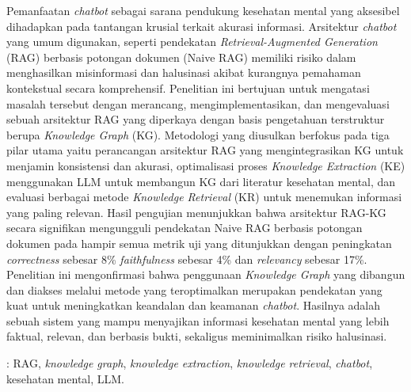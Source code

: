 Pemanfaatan \textit{chatbot} sebagai sarana pendukung kesehatan mental yang aksesibel dihadapkan pada tantangan krusial terkait akurasi informasi.
Arsitektur \textit{chatbot} yang umum digunakan, seperti pendekatan \textit{Retrieval-Augmented Generation} (RAG) berbasis potongan dokumen (Naive RAG) memiliki risiko dalam menghasilkan misinformasi dan halusinasi akibat kurangnya pemahaman kontekstual secara komprehensif.
Penelitian ini bertujuan untuk mengatasi masalah tersebut dengan merancang, mengimplementasikan, dan mengevaluasi sebuah arsitektur RAG yang diperkaya dengan basis pengetahuan terstruktur berupa \textit{Knowledge Graph} (KG).
Metodologi yang diusulkan berfokus pada tiga pilar utama yaitu perancangan arsitektur RAG yang mengintegrasikan KG untuk menjamin konsistensi dan akurasi, optimalisasi proses \textit{Knowledge Extraction} (KE) menggunakan LLM untuk membangun KG dari literatur kesehatan mental, dan evaluasi berbagai metode \textit{Knowledge Retrieval} (KR) untuk menemukan informasi yang paling relevan.
Hasil pengujian menunjukkan bahwa arsitektur RAG-KG secara signifikan mengungguli pendekatan Naive RAG berbasis potongan dokumen pada hampir semua metrik uji yang ditunjukkan dengan peningkatan \textit{correctness} sebesar 8\% \textit{faithfulness} sebesar 4\%  dan \textit{relevancy} sebesar 17\%.
Penelitian ini mengonfirmasi bahwa penggunaan \textit{Knowledge Graph} yang dibangun dan diakses melalui metode yang teroptimalkan merupakan pendekatan yang kuat untuk meningkatkan keandalan dan keamanan \textit{chatbot}.
Hasilnya adalah sebuah sistem yang mampu menyajikan informasi kesehatan mental yang lebih faktual, relevan, dan berbasis bukti, sekaligus meminimalkan risiko halusinasi.

 : RAG, \textit{knowledge graph}, \textit{knowledge extraction}, \textit{knowledge retrieval}, \textit{chatbot}, kesehatan mental, LLM.




